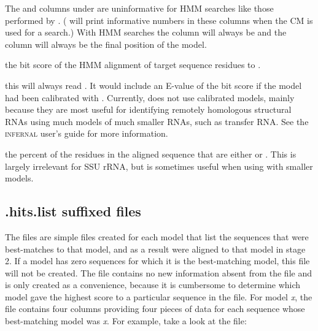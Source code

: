 The  and  columns under  are
uninformative for HMM searches like those performed by
. ( will print informative numbers in
these columns when the CM is used for a search.) With HMM searches the
 column will always be  and the  column
will always be the final position of the model.

\begin{wideitem}

\item[\emprog{bit sc}] the bit score of the HMM alignment of
  target sequence residues  to .

\item[\emprog{E-value}] this will always read \prog{-}. It would
  include an E-value of the bit score if the model had been calibrated
  with . Currently,  does not use
  calibrated models, mainly because they are most useful for
  identifying remotely homologous structural RNAs using much models of
  much smaller RNAs, such as transfer RNA. See the \textsc{infernal}
  user's guide for more information.

\item[\emprog{GC\%}] the percent of the residues in the aligned
  sequence that are either  or . This is largely
  irrelevant for SSU rRNA, but is sometimes useful when using
   with smaller models.
\end{wideitem}

\subsection{.hits.list suffixed files}

The  files are simple files created for each model
that list the sequences that were best-matches to that model, and as a
result were aligned to that model in stage 2. If a model has zero
sequences for which it is the best-matching model, this file will not
be created. The file contains no new information absent from the
 file and is only created as a convenience, because it is
cumbersome to determine which model gave the highest score to a
particular sequence in the  file.  For model \emph{x}, the
 file contains four columns providing four pieces of
data for each sequence whose best-matching model was \emph{x}. For
example, take a look at the 
file:

